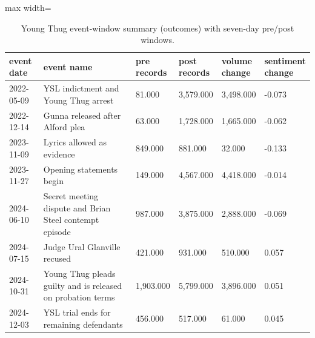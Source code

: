 \documentclass[12pt]{article}
\begin{document}
\begin{table}[H]
\centering
\caption{Young Thug event-window summary (outcomes) with seven-day pre/post windows.}
\label{tab:young_event_summary}
\scriptsize
\setlength{\tabcolsep}{4pt}
\renewcommand{\arraystretch}{1.15}
\begin{adjustbox}{max width=\linewidth}
\begin{tabular}{p{0.12\linewidth}p{0.40\linewidth}p{0.12\linewidth}p{0.12\linewidth}p{0.12\linewidth}p{0.12\linewidth}}
\toprule
event date & event name & pre records & post records & volume change & sentiment change \\
\midrule
2022-05-09 & YSL indictment and Young Thug arrest & 81.000 & 3,579.000 & 3,498.000 & -0.073 \\
2022-12-14 & Gunna released after Alford plea & 63.000 & 1,728.000 & 1,665.000 & -0.062 \\
2023-11-09 & Lyrics allowed as evidence & 849.000 & 881.000 & 32.000 & -0.133 \\
2023-11-27 & Opening statements begin & 149.000 & 4,567.000 & 4,418.000 & -0.014 \\
2024-06-10 & Secret meeting dispute and Brian Steel contempt episode & 987.000 & 3,875.000 & 2,888.000 & -0.069 \\
2024-07-15 & Judge Ural Glanville recused & 421.000 & 931.000 & 510.000 & 0.057 \\
2024-10-31 & Young Thug pleads guilty and is released on probation terms & 1,903.000 & 5,799.000 & 3,896.000 & 0.051 \\
2024-12-03 & YSL trial ends for remaining defendants & 456.000 & 517.000 & 61.000 & 0.045 \\
\bottomrule
\end{tabular}
\end{adjustbox}
\end{table}
\end{document}

